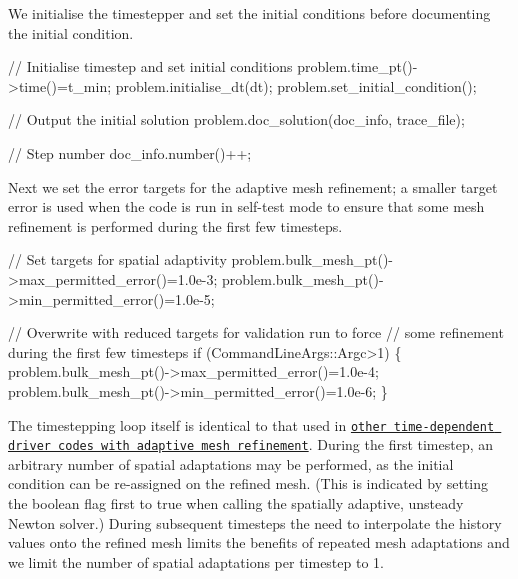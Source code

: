 We initialise the timestepper and set the initial conditions before documenting the initial condition.


\begin{DoxyCodeInclude}

 \textcolor{comment}{// Initialise timestep and set initial conditions}
 problem.time\_pt()->time()=t\_min;
 problem.initialise\_dt(dt);
 problem.set\_initial\_condition();
 
  \textcolor{comment}{// Output the initial solution}
 problem.doc\_solution(doc\_info, trace\_file);
 
 \textcolor{comment}{// Step number}
 doc\_info.number()++;

\end{DoxyCodeInclude}


Next we set the error targets for the adaptive mesh refinement; a smaller target error is used when the code is run in self-\/test mode to ensure that some mesh refinement is performed during the first few timesteps.


\begin{DoxyCodeInclude}


 \textcolor{comment}{// Set targets for spatial adaptivity}
 problem.bulk\_mesh\_pt()->max\_permitted\_error()=1.0e-3;
 problem.bulk\_mesh\_pt()->min\_permitted\_error()=1.0e-5;

 \textcolor{comment}{// Overwrite with reduced targets for validation run to force}
 \textcolor{comment}{// some refinement during the first few timesteps}
 \textcolor{keywordflow}{if} (CommandLineArgs::Argc>1)
  \{
   problem.bulk\_mesh\_pt()->max\_permitted\_error()=1.0e-4;
   problem.bulk\_mesh\_pt()->min\_permitted\_error()=1.0e-6;
  \}

\end{DoxyCodeInclude}


The timestepping loop itself is identical to that used in \href{../../../unsteady_heat/two_d_unsteady_heat_adapt/html/index.html}{\tt other time-\/dependent driver codes with adaptive mesh refinement}. During the first timestep, an arbitrary number of spatial adaptations may be performed, as the initial condition can be re-\/assigned on the refined mesh. (This is indicated by setting the boolean flag {\ttfamily first} to {\ttfamily true} when calling the spatially adaptive, unsteady Newton solver.) During subsequent timesteps the need to interpolate the history values onto the refined mesh limits the benefits of repeated mesh adaptations and we limit the number of spatial adaptations per timestep to 1.


